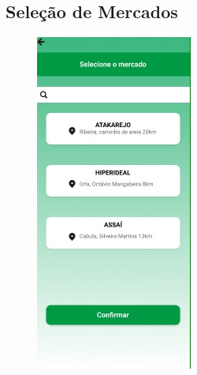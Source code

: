 \documentclass[12pt,oneside,a4paper,article]{abntex2}
\begin{document}
    \subsection{Seleção de Mercados}
    \begin{figure}[H]
        \centering
        \includegraphics[width=0.5\linewidth]{imagens-template//telas/seleçãoMercado.jpg}
        \label{fig:placeholder}
    \end{figure}
\end{document}
